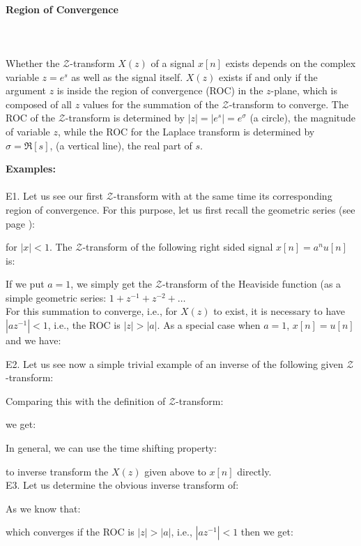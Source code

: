 	\paragraph{Region of Convergence}\mbox{}\\\\
	Whether the $\mathcal{Z}$-transform $X(z)$ of a signal $x[n]$ exists depends on the complex variable $z=e^s$ as well as the signal itself. $X(z)$ exists if and only if the argument $z$ is inside the region of convergence (ROC) in the $z$-plane, which is composed of all $z$ values for the summation of the $\mathcal{Z}$-transform to converge. The ROC of the $\mathcal{Z}$-transform is determined by $|z|=|e^s|=e^{\sigma}$ (a circle), the magnitude of variable $z$, while the ROC for the Laplace transform is determined by $\sigma=\Re[s]$, (a vertical line), the real part of $s$. 
	
	\begin{tcolorbox}[colframe=black,colback=white,sharp corners]
	\textbf{{\Large {}}Examples:}\\\\
	E1. Let us see our first $\mathcal{Z}$-transform with at the same time its corresponding region of convergence. For this purpose, let us first recall the geometric series (see page \pageref{sum of powers}):
	
	for $|x|<1$. The $\mathcal{Z}$-transform of the following right sided signal $x[n]=a^n u[n]$ is:
	
	\end{tcolorbox}
	
	\begin{tcolorbox}[colframe=black,colback=white,sharp corners]
	
	If we put $a=1$, we simply get the $\mathcal{Z}$-transform of the Heaviside function (as a simple geometric series: $1+z^{-1}+z^{-2}+\ldots$\\
	
	For this summation to converge, i.e., for $X(z)$ to exist, it is necessary to have $| az^{-1} |<1$, i.e., the ROC is $|z| > |a|$. As a special case when $a=1$, $x[n]=u[n]$ and we have:
	
	E2. Let us see now a simple trivial example of an inverse of the following given $\mathcal{Z}$-transform:
	
	Comparing this with the definition of $\mathcal{Z}$-transform:
	
	we get:
	
	In general, we can use the time shifting property:
	
	to inverse transform the $X(z)$ given above to $x[n]$ directly.\\
	
	E3.  Let us determine the obvious inverse transform of:
	
	As we know that:
	
	which converges if the ROC is $|z|>|a|$, i.e., $|az^{-1}|<1$ then we get:
	
	\end{tcolorbox}
	
